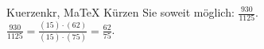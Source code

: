 \begin{MAufgabe}{Kuerzen}{kr, MaTeX}
K\"urzen Sie soweit m\"oglich: $\frac{930}{1125}$.\\ 
\ifLsg\MLoesung
\quad $\frac{930}{1125}=\frac{(15)\cdot(62)}{(15)\cdot(75)}=\frac{62}{75}$.\else\relax\fi
 \end{MAufgabe}